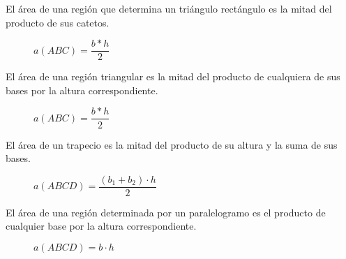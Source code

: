\begin{theorem}
    El área de una región que determina un triángulo rectángulo es la mitad del producto de sus catetos.

    \begin{figure}[!h]
        \centering
        
        \caption{$a(ABC) = \dfrac{b * h}{2}$}
        \label{fig:area-triangular}
    \end{figure}
    
\end{theorem}

\begin{theorem}
    El área de una región triangular es la mitad del producto de cualquiera de sus bases por la altura correspondiente.

    \begin{figure}[!h]
        \centering
        
        \caption{$a(ABC) = \dfrac{b * h}{2}$}
        \label{fig:area-triangular-cualquiera}
    \end{figure}
    
\end{theorem}

\begin{theorem}
    El área de un trapecio es la mitad del producto de su altura y la suma de sus bases.

    \begin{figure}[!h]
        \centering
        
        \caption{$a(ABCD) = \dfrac{(b_1 + b_2) \cdot h}{2}$}
        \label{fig:area-trapezoid}
    \end{figure}
    
\end{theorem}

\clearpage

\begin{theorem}
    El área de una región determinada por un paralelogramo es el producto de cualquier base por la altura correspondiente.    

    \begin{figure}[!h]
        \centering
        
        \caption{$a(ABCD) = b \cdot h$}
        \label{fig:area-paralelogramo}
    \end{figure}
    
\end{theorem}

